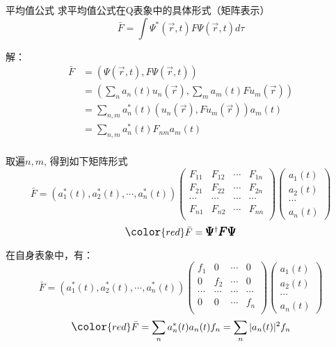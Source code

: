 \begin{frame} 
    \frametitle{}
    \begin{tcolorbox1}{平均值公式}
        求平均值公式在Q表象中的具体形式（矩阵表示）
        $$ \bar{F}=\int \Psi^* (\vec{r},t) F \Psi(\vec{r},t) d\tau $$
    \end{tcolorbox1}
    \alert{解：} 
    \begin{equation*}
        \begin{split}
            \bar{F}&=(\Psi(\vec{r},t), F\Psi(\vec{r},t)) \\
            &= (\sum_n a_n(t) u_n(\vec{r}), \sum_m a_m(t) F u_m(\vec{r}))\\
            &= \sum_{n,m} a_n ^*(t) (u_n(\vec{r}), F u_m(\vec{r})) a_m(t)\\
            &= \sum_{n,m} a_n ^*(t) F_{nm} a_m(t)\\
        \end{split} 
    \end{equation*}
\end{frame}

\begin{frame} 
    取遍$n, m$, 得到如下矩阵形式\\
    $$\bar{F} =(a_1 ^*(t), a_2 ^*(t),\cdots,a_n^*(t) )
    \begin{pmatrix}
       F_{11} & F_{12} & \cdots & F_{1n} \\
       F_{21} & F_{22} & \cdots & F_{2n} \\
       \cdots & \cdots &  \cdots& \cdots\\
        F_{n1} & F_{n2} & \cdots & F_{nn} \\
    \end{pmatrix}
    \begin{pmatrix}
        a_1(t)\\
        a_2(t)\\
        \cdots \\
        a_n(t)
    \end{pmatrix}
    $$ \vspace{1.0em} 
    $$ \large \color{red} \bar{F} = \pmb {\Psi} ^{\dagger } \pmb {F} \pmb {\Psi} $$
\end{frame}

\begin{frame} 
    在自身表象中，有：
    $$\bar{F} =(a_1 ^*(t), a_2 ^*(t),\cdots,a_n^*(t) )
    \begin{pmatrix}
       f_1 & 0 & \cdots & 0 \\
       0& f_2 & \cdots & 0 \\
       \cdots & \cdots &  \cdots& \cdots\\
        0 & 0 & \cdots & f_n \\
    \end{pmatrix}
    \begin{pmatrix}
        a_1(t)\\
        a_2(t)\\
        \cdots \\
        a_n(t)
    \end{pmatrix}
    $$
    \vspace{1.0em} 
    $$ \large \color{red} \bar{F} = \sum_n a_n^*(t) a_n(t) f_n= \sum_n |a_n(t)|^2 f_n $$
\end{frame}

